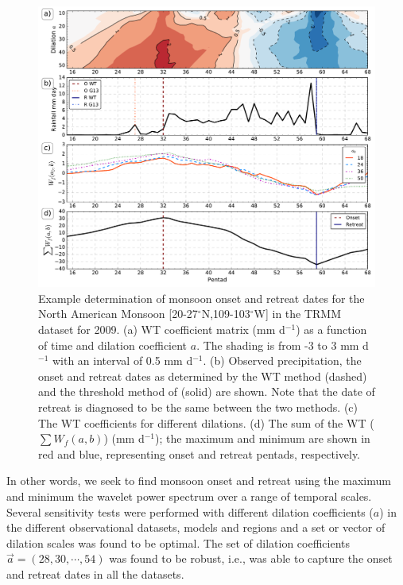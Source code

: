 \begin{figure}[t!]
\centering
 \includegraphics[width=\linewidth]{figures/wav_fig3.pdf}
\caption[Example determination of onset and retreat in TRMM]{ Example determination of monsoon onset and retreat dates for the North American Monsoon [20-27$^\circ$N,109-103$^\circ$W] in the TRMM dataset for 2009.
(a) WT coefficient matrix (mm d$^{-1}$) as a function of time and dilation coefficient $a$. The shading is from -3 to 3 mm d$^{-1}$  with an interval of 0.5 mm d$^{-1}$.
(b) Observed precipitation, the onset and retreat dates as determined by the WT method (dashed) and the threshold method of \cite{geil2013} (solid) are shown. Note that the date of retreat is diagnosed to be the same between the two methods.
(c) The WT coefficients for different dilations. (d) The sum of the WT ($\sum W_f(a,b)$) (mm d$^{-1}$); the maximum and minimum are shown in red and blue, representing onset and retreat pentads, respectively.  }
\label{fig:wvt_3}
\end{figure}

In other words, we seek to find monsoon onset and retreat using the maximum and minimum the wavelet power spectrum over a range of temporal scales.
Several sensitivity tests were performed with different dilation coefficients ($a$) in the different observational datasets, models and regions and a set or vector of dilation scales was found to be optimal. 
The set of dilation coefficients $\vec{a} = (28,30,\cdots, 54)$ was found to be robust, i.e., was able to capture the onset and retreat dates in all the datasets.

